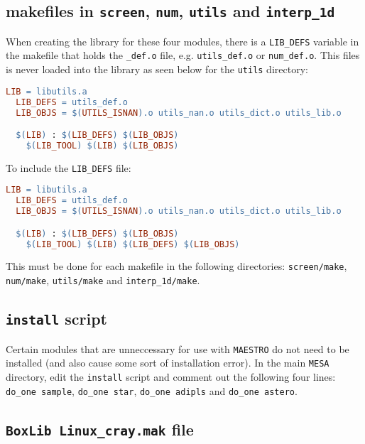 \subsection{makefiles in {\tt screen}, {\tt num}, {\tt utils} and 
{\tt interp\_1d}}

When creating the library for these four modules, there is a {\tt LIB\_DEFS} 
variable in the makefile that holds the {\tt *\_def.o} file, e.g. 
{\tt utils\_def.o} or {\tt num\_def.o}. This files is never loaded into the 
library as seen below for the {\tt utils} directory:
\begin{lstlisting}[language=make,mathescape=false]
  LIB = libutils.a
  LIB_DEFS = utils_def.o
  LIB_OBJS = $(UTILS_ISNAN).o utils_nan.o utils_dict.o utils_lib.o

  $(LIB) : $(LIB_DEFS) $(LIB_OBJS)
  	$(LIB_TOOL) $(LIB) $(LIB_OBJS)
\end{lstlisting}
To include the {\tt LIB\_DEFS} file:
\begin{lstlisting}[language=make,mathescape=false]
  LIB = libutils.a
  LIB_DEFS = utils_def.o
  LIB_OBJS = $(UTILS_ISNAN).o utils_nan.o utils_dict.o utils_lib.o

  $(LIB) : $(LIB_DEFS) $(LIB_OBJS)
  	$(LIB_TOOL) $(LIB) $(LIB_DEFS) $(LIB_OBJS)
\end{lstlisting}
This must be done for each makefile in the following directories: 
{\tt screen/make}, {\tt num/make}, {\tt utils/make} and {\tt interp\_1d/make}.

\subsection{{\tt install} script}

Certain modules that are unneccessary for use with {\tt MAESTRO} do not need 
to be installed (and also cause some sort of installation error). In the 
main {\tt MESA} directory, edit the {\tt install} script and comment out 
the following four lines: {\tt do\_one sample}, {\tt do\_one star}, 
{\tt do\_one adipls} and {\tt do\_one astero}.

\subsection{{\tt BoxLib Linux\_cray.mak} file}

